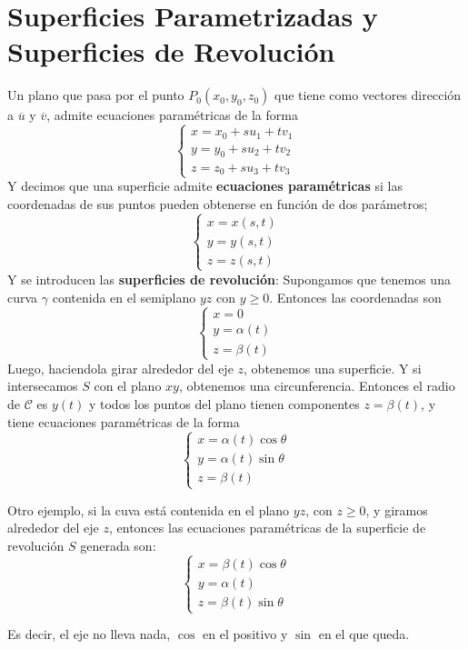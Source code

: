 \documentclass[11pt,a4paper]{article}
\begin{document}
\section{Superficies Parametrizadas y Superficies de Revoluci\'on}
Un plano que pasa por el punto $P_0(x_0,y_0,z_0)$ que tiene como vectores direcci\'on a $\overline{u}$ y $\overline{v}$, admite ecuaciones param\'etricas de la forma 
$$\begin{cases} x = x_0 + s u_1 + tv_1 \\ y = y_0 + s u_2 + tv_2 \\ z = z_0 + s u_3 + tv_3\end{cases}$$
Y decimos que una superficie admite \textbf{ecuaciones param\'etricas} si las coordenadas de sus puntos pueden obtenerse en funci\'on de dos par\'ametros;
$$\begin{cases} x = x(s,t) \\ y = y(s,t) \\ z = z(s,t) \end{cases}$$
Y se introducen las \textbf{superficies de revoluci\'on}: Supongamos que tenemos una curva $\gamma$ contenida en el semiplano $yz$ con $y \geq 0$. Entonces las coordenadas son 
$$\begin{cases} x=0 \\ y=\alpha(t) \\ z=\beta(t) \end{cases}$$
Luego, haciendola girar alrededor del eje $z$, obtenemos una superficie. Y si intersecamos $S$ con el plano $xy$, obtenemos una circunferencia. Entonces el radio de $\mathcal{C}$ es $y(t)$ y todos los puntos del plano tienen componentes $z = \beta(t)$, y tiene ecuaciones param\'etricas de la forma $$\begin{cases} x=\alpha(t) \cos \theta \\ y= \alpha(t) \sin \theta \\ z=\beta(t) \end{cases}$$

Otro ejemplo, si la cuva est\'a contenida en el plano $yz$, con $z \geq 0$, y giramos alrededor del eje $z$, entonces las ecuaciones param\'etricas de la superficie de revoluci\'on $S$ generada son:
$$\begin{cases} x=\beta(t) \cos \theta \\ y = \alpha(t) \\ z = \beta(t) \sin \theta \end{cases}$$

Es decir, el eje no lleva nada, $\cos$ en el positivo y $\sin$ en el que queda.
\end{document}
